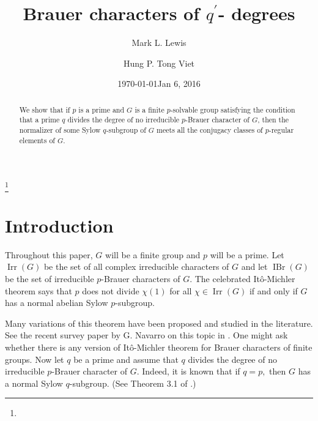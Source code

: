 \documentclass[12pt]{amsart}
\theoremstyle{remark}
\numberwithin{equation}{section}
\begin{document}
\title[Brauer characters of $q^\prime$-degrees]{Brauer characters of $q^\prime$- degrees}

\author[M. L. Lewis]{Mark L. Lewis}
\address{Department of Mathematical Sciences, Kent State University, Kent, OH 44242, USA}

\author[H. P. Tong-Viet]{Hung P. Tong Viet}
\address{Department of Mathematical Sciences, Kent State University, Kent, OH 44242, USA}

\thanks{}


\date{\today}

\date{Jan 6, 2016}


\begin{abstract}
We show that if $p$ is a prime and $G$ is a finite $p$-solvable group satisfying the condition that a prime $q$ divides the degree of no irreducible $p$-Brauer character of $G$, then the normalizer of some Sylow $q$-subgroup of $G$ meets all the conjugacy classes of $p$-regular elements of $G$.
\end{abstract}

\maketitle

\section{Introduction}

Throughout this paper, $G$ will be a finite group and $p$ will be a prime. Let $\operatorname{Irr} (G)$ be the set of all complex  irreducible characters of $G$ and  let $\operatorname{IBr} (G)$ be the set of irreducible $p$-Brauer characters of $G$.  The celebrated It\^{o}-Michler theorem says that $p$ does not divide $\chi (1)$ for all $\chi \in \operatorname{Irr} (G)$ if and only if $G$ has a normal abelian Sylow $p$-subgroup.

Many variations of this theorem have been proposed and studied in the literature.  See the recent survey paper by G. Navarro on this topic in \cite{N1}.  One might ask whether there is any version of It\^{o}-Michler theorem for Brauer characters of finite groups. Now let $q$ be a prime and assume that $q$ divides the degree of no irreducible $p$-Brauer character of $G.$  Indeed, it is known that if $q=p,$ then $G$ has a normal Sylow $q$-subgroup.  (See Theorem 3.1 of \cite{N1}.)
\end{document}
